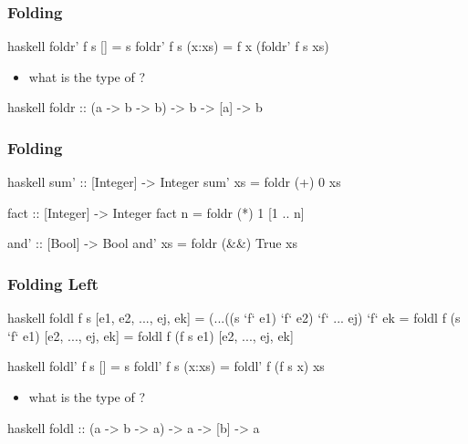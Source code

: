 \documentclass[dvipsnames]{beamer}
\theoremstyle{plain}
\begin{document}
\begin{frame}[fragile]
  \frametitle{Folding}

  \begin{exampleblock}{}
    \begin{pygments}{haskell}
foldr' f s []     = s
foldr' f s (x:xs) = f x (foldr' f s xs)
    \end{pygments}

    \begin{itemize}
      \item what is the type of ?
    \end{itemize}

    \pause
    \begin{pygments}{haskell}
foldr :: (a -> b -> b) -> b -> [a] -> b
    \end{pygments}
  \end{exampleblock}
\end{frame}

\begin{frame}[fragile]
  \frametitle{Folding}

  \begin{exampleblock}{}
    \begin{pygments}{haskell}
sum' :: [Integer] -> Integer
sum' xs = foldr (+) 0 xs

fact :: [Integer] -> Integer
fact n = foldr (*) 1 [1 .. n]

and' :: [Bool] -> Bool
and' xs = foldr (&&) True xs
    \end{pygments}
  \end{exampleblock}
\end{frame}

\begin{frame}[fragile]
  \frametitle{Folding Left}

  \begin{block}{}
    \begin{pygments}{haskell}
foldl f s [e1, e2, ..., ej, ek]
    = (...((s `f` e1) `f` e2) `f` ... ej) `f` ek
    = foldl f (s `f` e1) [e2, ..., ej, ek]
    = foldl f (f s e1) [e2, ..., ej, ek]
    \end{pygments}
  \end{block}

  \pause
  \begin{exampleblock}{}
    \begin{pygments}{haskell}
foldl' f s []     = s
foldl' f s (x:xs) = foldl' f (f s x) xs
    \end{pygments}
  \end{exampleblock}

  \begin{itemize}
    \item what is the type of ?
  \end{itemize}

  \begin{pygments}{haskell}
foldl :: (a -> b -> a) -> a -> [b] -> a
  \end{pygments}
\end{frame}
\end{document}
